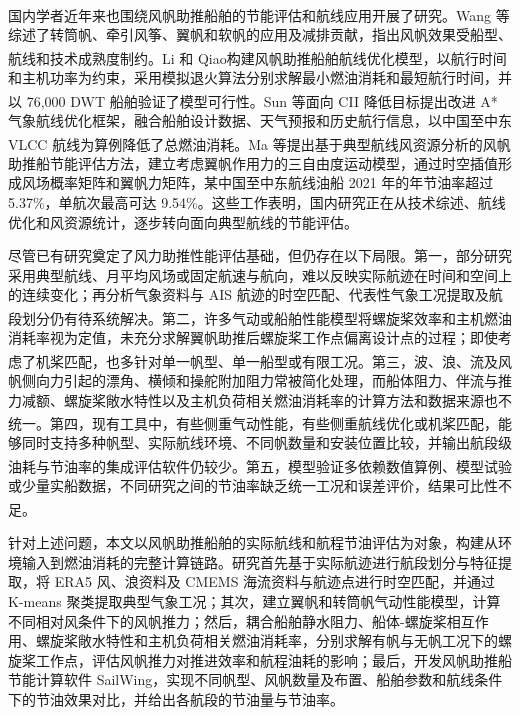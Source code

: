\documentclass[UTF8,a4paper,twoside,zihao=5,fontset=windows]{ctexart}
\begin{document}
国内学者近年来也围绕风帆助推船舶的节能评估和航线应用开展了研究。Wang 等\textsuperscript{\cite{wang2022}}综述了转筒帆、牵引风筝、翼帆和软帆的应用及减排贡献，指出风帆效果受船型、航线和技术成熟度制约。Li 和 Qiao\textsuperscript{\cite{liqiao2019}}构建风帆助推船舶航线优化模型，以航行时间和主机功率为约束，采用模拟退火算法分别求解最小燃油消耗和最短航行时间，并以 76,000 DWT 船舶验证了模型可行性。Sun 等\textsuperscript{\cite{sun2022}}面向 CII 降低目标提出改进 A* 气象航线优化框架，融合船舶设计数据、天气预报和历史航行信息，以中国至中东 VLCC 航线为算例降低了总燃油消耗。Ma 等\textsuperscript{\cite{ma2023}}提出基于典型航线风资源分析的风帆助推船节能评估方法，建立考虑翼帆作用力的三自由度运动模型，通过时空插值形成风场概率矩阵和翼帆力矩阵，某中国至中东航线油船 2021 年的年节油率超过 5.37\%，单航次最高可达 9.54\%。这些工作表明，国内研究正在从技术综述、航线优化和风资源统计，逐步转向面向典型航线的节能评估。

尽管已有研究奠定了风力助推性能评估基础，但仍存在以下局限。第一，部分研究采用典型航线、月平均风场或固定航速与航向，难以反映实际航迹在时间和空间上的连续变化；再分析气象资料与 AIS 航迹的时空匹配、代表性气象工况提取及航段划分仍有待系统解决\textsuperscript{\cite{sun2022,ma2023}}。第二，许多气动或船舶性能模型将螺旋桨效率和主机燃油消耗率视为定值，未充分求解翼帆助推后螺旋桨工作点偏离设计点的过程；即使考虑了机桨匹配，也多针对单一帆型、单一船型或有限工况\textsuperscript{\cite{lu2020,tillig2020,vigna2023}}。第三，波、浪、流及风帆侧向力引起的漂角、横倾和操舵附加阻力常被简化处理，而船体阻力、伴流与推力减额、螺旋桨敞水特性以及主机负荷相关燃油消耗率的计算方法和数据来源也不统一\textsuperscript{\cite{holtrop1982,holtrop1984,harvald1983,molland2011,bentin2016,seddiek2021}}。第四，现有工具中，有些侧重气动性能，有些侧重航线优化或机桨匹配，能够同时支持多种帆型、实际航线环境、不同帆数量和安装位置比较，并输出航段级油耗与节油率的集成评估软件仍较少\textsuperscript{\cite{lr2021flettner,charlou2023}}。第五，模型验证多依赖数值算例、模型试验或少量实船数据，不同研究之间的节油率缺乏统一工况和误差评价，结果可比性不足\textsuperscript{\cite{viola2015,li2020,zhu2023}}。

针对上述问题，本文以风帆助推船舶的实际航线和航程节油评估为对象，构建从环境输入到燃油消耗的完整计算链路。研究首先基于实际航迹进行航段划分与特征提取，将 ERA5 风、浪资料及 CMEMS 海流资料与航迹点进行时空匹配，并通过 K-means 聚类提取典型气象工况；其次，建立翼帆和转筒帆气动性能模型，计算不同相对风条件下的风帆推力；然后，耦合船舶静水阻力、船体-螺旋桨相互作用、螺旋桨敞水特性和主机负荷相关燃油消耗率，分别求解有帆与无帆工况下的螺旋桨工作点，评估风帆推力对推进效率和航程油耗的影响；最后，开发风帆助推船节能计算软件 SailWing，实现不同帆型、风帆数量及布置、船舶参数和航线条件下的节油效果对比，并给出各航段的节油量与节油率。
\end{document}
